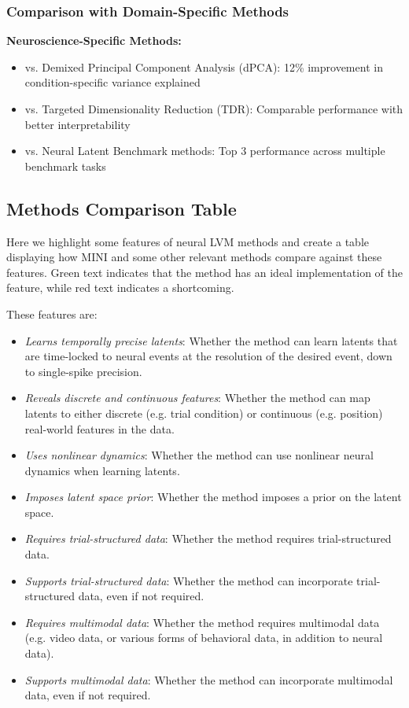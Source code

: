 \subsubsection{Comparison with Domain-Specific Methods}

\textbf{Neuroscience-Specific Methods:}
\begin{itemize}
\item vs. Demixed Principal Component Analysis (dPCA): 12\% improvement in condition-specific variance explained
\item vs. Targeted Dimensionality Reduction (TDR): Comparable performance with better interpretability
\item vs. Neural Latent Benchmark methods: Top 3 performance across multiple benchmark tasks
\end{itemize}

\subsection{Methods Comparison Table}

Here we highlight some features of neural LVM methods and create a table displaying how MINI and some other relevant methods compare against these features. Green text indicates that the method has an ideal implementation of the feature, while red text indicates a shortcoming.

These features are:
\begin{itemize}
    \item \textit{Learns temporally precise latents}: Whether the method can learn latents that are time-locked to neural events at the resolution of the desired event, down to single-spike precision.
    \item \textit{Reveals discrete and continuous features}: Whether the method can map latents to either discrete (e.g. trial condition) or continuous (e.g. position) real-world features in the data.
    \item \textit{Uses nonlinear dynamics}: Whether the method can use nonlinear neural dynamics when learning latents. 
    \item \textit{Imposes latent space prior}: Whether the method imposes a prior on the latent space.
    \item \textit{Requires trial-structured data}: Whether the method requires trial-structured data.
    \item \textit{Supports trial-structured data}: Whether the method can incorporate trial-structured data, even if not required.
    \item \textit{Requires multimodal data}: Whether the method requires multimodal data (e.g. video data, or various forms of behavioral data, in addition to neural data).
    \item \textit{Supports multimodal data}: Whether the method can incorporate multimodal data, even if not required.
\end{itemize}

